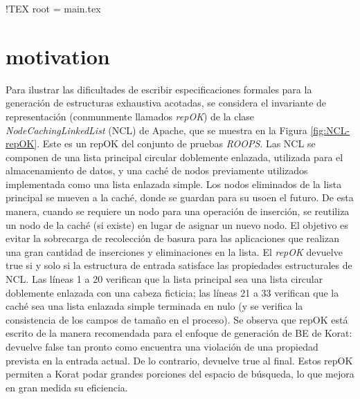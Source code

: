 !TEX root = main.tex
\chapter[Motivation]{motivation}
\label{cap:motivation}

Para ilustrar las dificultades de escribir especificaciones formales para la generación de estructuras exhaustiva acotadas, se considera el invariante de representación (conmunmente llamados \emph{repOK}) de la clase \emph{NodeCachingLinkedList} (NCL) de Apache, que se muestra en la Figura \ref{fig:NCL-repOK}. Este es un repOK del conjunto de pruebas \emph{ROOPS}. Las NCL se componen de una lista principal circular doblemente enlazada, utilizada para el almacenamiento de datos, y una caché de nodos previamente utilizados implementada como una lista enlazada simple. Los nodos eliminados de la lista principal se mueven a la caché, donde se guardan para su usoen el futuro. De esta manera, cuando se requiere un nodo para una operación de inserción, se reutiliza un nodo de la caché (si existe) en lugar de asignar un nuevo nodo. El objetivo es evitar la sobrecarga de recolección de basura para las aplicaciones que realizan una gran cantidad de inserciones y eliminaciones en la lista. El \emph{repOK} devuelve true si y solo si la estructura de entrada satisface las propiedades estructurales de NCL. Las líneas 1 a 20 verifican que la lista principal sea una lista circular doblemente enlazada con una cabeza ficticia; las líneas 21 a 33 verifican que la caché sea una lista enlazada simple terminada en nulo (y se verifica la consistencia de los campos de tamaño en el proceso). Se observa que repOK está escrito de la manera recomendada para el enfoque de generación de BE de Korat: devuelve false tan pronto como encuentra una violación de una propiedad prevista en la entrada actual. De lo contrario, devuelve true al final. Estos repOK permiten a Korat podar grandes porciones del espacio de búsqueda, lo que mejora en gran medida su eficiencia.



